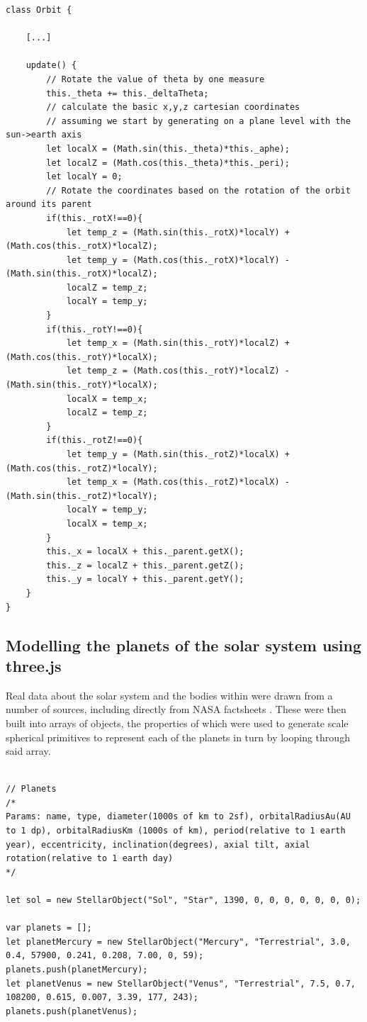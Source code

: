\documentclass[twoside]{bhamthesis}
\begin{document}
\begin{lstlisting}[label=Implemented code for rotation in 3D space, caption=Implemented code for rotation in 3D space on an update() call, captionpos=b]
class Orbit {

	[...]
	
	update() {
		// Rotate the value of theta by one measure
		this._theta += this._deltaTheta;
		// calculate the basic x,y,z cartesian coordinates
		// assuming we start by generating on a plane level with the sun->earth axis
		let localX = (Math.sin(this._theta)*this._aphe);
		let localZ = (Math.cos(this._theta)*this._peri);
		let localY = 0;
		// Rotate the coordinates based on the rotation of the orbit around its parent
		if(this._rotX!==0){
			let temp_z = (Math.sin(this._rotX)*localY) + (Math.cos(this._rotX)*localZ);
			let temp_y = (Math.cos(this._rotX)*localY) - (Math.sin(this._rotX)*localZ);
			localZ = temp_z;
			localY = temp_y;
		}
		if(this._rotY!==0){
			let temp_x = (Math.sin(this._rotY)*localZ) + (Math.cos(this._rotY)*localX);
			let temp_z = (Math.cos(this._rotY)*localZ) - (Math.sin(this._rotY)*localX);
			localX = temp_x;
			localZ = temp_z;
		}
		if(this._rotZ!==0){
			let temp_y = (Math.sin(this._rotZ)*localX) + (Math.cos(this._rotZ)*localY);
			let temp_x = (Math.cos(this._rotZ)*localX) - (Math.sin(this._rotZ)*localY);
			localY = temp_y;
			localX = temp_x;
		}
		this._x = localX + this._parent.getX();
		this._z = localZ + this._parent.getZ();
		this._y = localY + this._parent.getY();
	}
}
\end{lstlisting}

\newpage

\subsection{Modelling the planets of the solar system using three.js}
Real data about the solar system and the bodies within were drawn from a number of sources, including directly from NASA factsheets \cite{nasa_planetary_2017}. These were then built into arrays of objects, the properties of which were used to generate scale spherical primitives to represent each of the planets in turn by looping through said array.

\begin{lstlisting}[label=Instances of the StellarObject class, caption=The planets as instances of the StellarObject class, captionpos=b]

// Planets
/*
Params: name, type, diameter(1000s of km to 2sf), orbitalRadiusAu(AU to 1 dp), orbitalRadiusKm (1000s of km), period(relative to 1 earth year), eccentricity, inclination(degrees), axial tilt, axial rotation(relative to 1 earth day)
*/

let sol = new StellarObject("Sol", "Star", 1390, 0, 0, 0, 0, 0, 0, 0);

var planets = [];
let planetMercury = new StellarObject("Mercury", "Terrestrial", 3.0, 0.4, 57900, 0.241, 0.208, 7.00, 0, 59);
planets.push(planetMercury);
let planetVenus = new StellarObject("Venus", "Terrestrial", 7.5, 0.7, 108200, 0.615, 0.007, 3.39, 177, 243);
planets.push(planetVenus);

\end{lstlisting}
\end{document}
